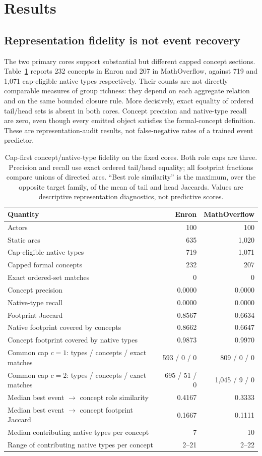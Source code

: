 \documentclass[10pt]{article}
\begin{document}
\section{Results}
\subsection{Representation fidelity is not event recovery}
The two primary cores support substantial but different capped concept sections. Table~\ref{tab:fidelity} reports 232 concepts in Enron and 207 in MathOverflow, against 719 and 1,071 cap-eligible native types respectively. Their counts are not directly comparable measures of group richness: they depend on each aggregate relation and on the same bounded closure rule. More decisively, exact equality of ordered tail/head sets is absent in both cores. Concept precision and native-type recall are zero, even though every emitted object satisfies the formal-concept definition. These are representation-audit results, not false-negative rates of a trained event predictor.

\begin{table}[H]
\centering
\caption{Cap-first concept/native-type fidelity on the fixed cores. Both role caps are three. Precision and recall use exact ordered tail/head equality; all footprint fractions compare unions of directed arcs. ``Best role similarity'' is the maximum, over the opposite target family, of the mean of tail and head Jaccards. Values are descriptive representation diagnostics, not predictive scores.}
\label{tab:fidelity}
\small
\begin{tabular}{@{}lrr@{}}
\toprule
Quantity & Enron & MathOverflow\\
\midrule
Actors & 100 & 100\\
Static arcs & 635 & 1,020\\
Cap-eligible native types & 719 & 1,071\\
Capped formal concepts & 232 & 207\\
Exact ordered-set matches & 0 & 0\\
Concept precision & 0.0000 & 0.0000\\
Native-type recall & 0.0000 & 0.0000\\
Footprint Jaccard & 0.8567 & 0.6634\\
Native footprint covered by concepts & 0.8662 & 0.6647\\
Concept footprint covered by native types & 0.9873 & 0.9970\\
\addlinespace
Common cap $c=1$: types / concepts / exact matches & 593 / 0 / 0 & 809 / 0 / 0\\
Common cap $c=2$: types / concepts / exact matches & 695 / 51 / 0 & 1,045 / 9 / 0\\
Median best event $\to$ concept role similarity & 0.4167 & 0.3333\\
Median best event $\to$ concept footprint Jaccard & 0.1667 & 0.1111\\
Median contributing native types per concept & 7 & 10\\
Range of contributing native types per concept & 2--21 & 2--22\\
\bottomrule
\end{tabular}
\end{table}
\end{document}

